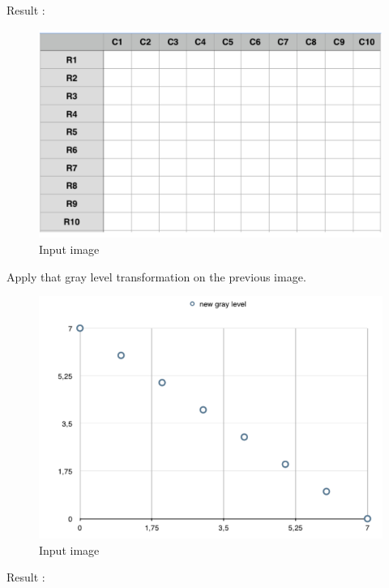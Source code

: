 \documentclass[12pt]{tdtp}
\begin{document}
Result :



\begin{figure}[h!]
	\begin{center}
		\includegraphics[scale=0.5]{images/I3.png}
		\caption{Input image}
	\end{center}
\end{figure}

\newpage 
\Exo


Apply that gray level transformation on the previous image.

\begin{figure}[h!]
	\begin{center}
		\includegraphics[scale=0.5]{images/I4.png}
		\caption{Input image}
	\end{center}
\end{figure}

Result :
\end{document}
